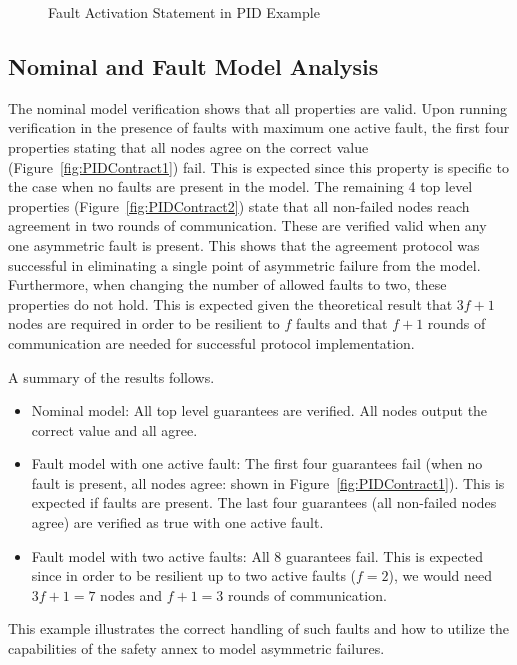 \begin{figure}[!htb]
        \caption{\label{fig:PID_faultActivationStmt} Fault Activation Statement in PID Example}
\end{figure}

\subsection{Nominal and Fault Model Analysis}
The nominal model verification shows that all properties are valid. Upon running verification in the presence of faults with maximum one active fault, the first four properties stating that all nodes agree on the correct value (Figure~\ref{fig:PIDContract1}) fail. This is expected since this property is specific to the case when no faults are present in the model. The remaining 4 top level properties (Figure~\ref{fig:PIDContract2}) state that all non-failed nodes reach agreement in two rounds of communication. These are verified valid when any one asymmetric fault is present. This shows that the agreement protocol was successful in eliminating a single point of asymmetric failure from the model. Furthermore, when changing the number of allowed faults to two, these properties do not hold. This is expected given the theoretical result that $3f+1$ nodes are required in order to be resilient to $f$ faults and that $f+1$ rounds of communication are needed for successful protocol implementation.

A summary of the results follows. 
\begin{itemize}
	\item Nominal model: All top level guarantees are verified. All nodes output the correct value and all agree. 
	\item Fault model with one active fault: The first four guarantees fail (when no fault is present, all nodes agree: shown in Figure~\ref{fig:PIDContract1}). This is expected if faults are present. The last four guarantees (all non-failed nodes agree) are verified as true with one active fault. 
	\item Fault model with two active faults: All 8 guarantees fail. This is expected since in order to be resilient up to two active faults ($f=2$), we would need $3f + 1 = 7$ nodes and $f+1 = 3$ rounds of communication. 
\end{itemize}

This example illustrates the correct handling of such faults and how to utilize the capabilities of the safety annex to model asymmetric failures. 
